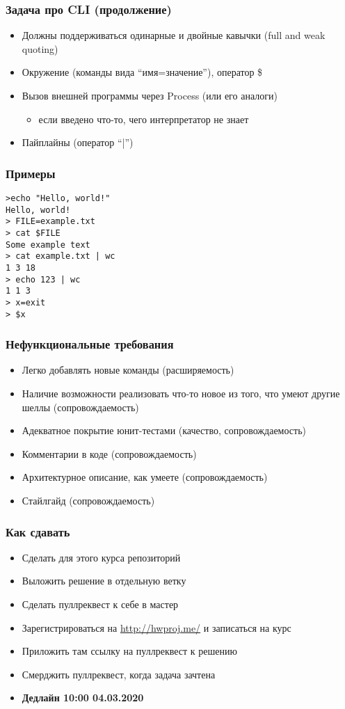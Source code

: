 \documentclass[xetex,mathserif,serif]{beamer}
\begin{document}
	\begin{frame}
		\frametitle{Задача про CLI (продолжение)}
		\begin{itemize}
			\item Должны поддерживаться одинарные и двойные кавычки (full and weak quoting)
			\item Окружение (команды вида ``имя=значение''), оператор \$
			\item Вызов внешней программы через Process (или его аналоги)
			\begin{itemize}
				\item если введено что-то, чего интерпретатор не знает
			\end{itemize}
			\item Пайплайны (оператор ``|'')
		\end{itemize}
	\end{frame}
	
	\begin{frame}[fragile]
		\frametitle{Примеры}
\begin{verbatim}
>echo "Hello, world!"
Hello, world!
> FILE=example.txt
> cat $FILE
Some example text
> cat example.txt | wc
1 3 18
> echo 123 | wc
1 1 3
> x=exit
> $x
\end{verbatim}
\end{frame}

	\begin{frame}
		\frametitle{Нефункциональные требования}
		\begin{itemize}
			\item Легко добавлять новые команды (расширяемость)
			\item Наличие возможности реализовать что-то новое из того, что умеют другие шеллы (сопровождаемость)
			\item Адекватное покрытие юнит-тестами (качество, сопровождаемость)
			\item Комментарии в коде (сопровождаемость)
			\item Архитектурное описание, как умеете (сопровождаемость)
			\item Стайлгайд (сопровождаемость)
		\end{itemize}
	\end{frame}
	
	\begin{frame}
		\frametitle{Как сдавать}
		\begin{itemize}
			\item Сделать для этого курса репозиторий
			\item Выложить решение в отдельную ветку
			\item Сделать пуллреквест к себе в мастер
			\item Зарегистрироваться на \url{http://hwproj.me/} и записаться на курс
			\item Приложить там ссылку на пуллреквест к решению
			\item Смерджить пуллреквест, когда задача зачтена
			\item \textbf{Дедлайн 10:00 04.03.2020}
		\end{itemize}
	\end{frame}
	
\end{document}
